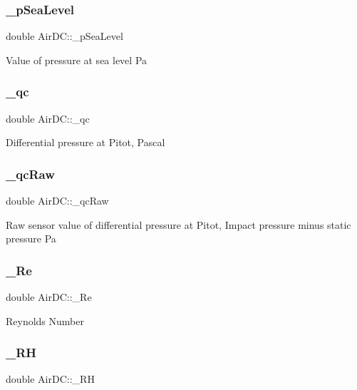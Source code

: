 \subsubsection{\texorpdfstring{\+\_\+p\+Sea\+Level}{\_pSeaLevel}}
{\footnotesize\ttfamily double Air\+D\+C\+::\+\_\+p\+Sea\+Level}

Value of pressure at sea level Pa \mbox{\label{class_air_d_c_a1b24442b698f10a05b0f577cd29b2354}} 
\subsubsection{\texorpdfstring{\+\_\+qc}{\_qc}}
{\footnotesize\ttfamily double Air\+D\+C\+::\+\_\+qc}

Differential pressure at Pitot, Pascal \mbox{\label{class_air_d_c_a0230a9cb98053c272cbe4c759fb944a7}} 
\subsubsection{\texorpdfstring{\+\_\+qc\+Raw}{\_qcRaw}}
{\footnotesize\ttfamily double Air\+D\+C\+::\+\_\+qc\+Raw}

Raw sensor value of differential pressure at Pitot, Impact pressure minus static pressure Pa \mbox{\label{class_air_d_c_ab3ab74af3a00dea2bcd0bab893b43eff}} 
\subsubsection{\texorpdfstring{\+\_\+\+Re}{\_Re}}
{\footnotesize\ttfamily double Air\+D\+C\+::\+\_\+\+Re}

Reynolds Number \mbox{\label{class_air_d_c_a97e285a95da76399ef1b80d317304b08}} 
\subsubsection{\texorpdfstring{\+\_\+\+RH}{\_RH}}
{\footnotesize\ttfamily double Air\+D\+C\+::\+\_\+\+RH}

